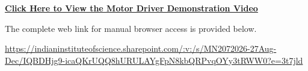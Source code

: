 \documentclass[11pt,a4paper]{article}
\begin{document}
\vspace{0.4cm}
\begin{center}
\href{https://indianinstituteofscience.sharepoint.com/:v:/s/MN2072026-27Aug-Dec/IQBDHjg9-icaQKrUQQ8hURULAYgFpN8kbQRPvqOYy3tRWW0?e=3t7jld}{\large \textbf{Click Here to View the Motor Driver Demonstration Video}}
\end{center}

\vspace{0.4cm}
\noindent
The complete web link for manual browser access is provided below.

\vspace{0.2cm}
\noindent
{\footnotesize \url{https://indianinstituteofscience.sharepoint.com/:v:/s/MN2072026-27Aug-Dec/IQBDHjg9-icaQKrUQQ8hURULAYgFpN8kbQRPvqOYy3tRWW0?e=3t7jld}}
\end{document}
